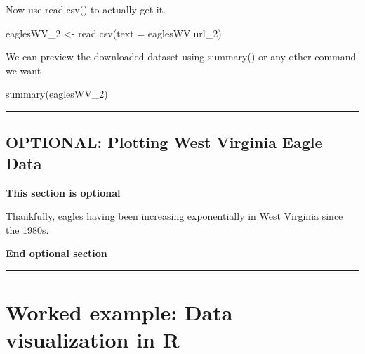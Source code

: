 \documentclass[
]{book}
\newenvironment{Shaded}{\begin{snugshade}}{\end{snugshade}}
\newcommand{\AttributeTok}[1]{\textcolor[rgb]{0.77,0.63,0.00}{#1}}
\newcommand{\FunctionTok}[1]{\textcolor[rgb]{0.00,0.00,0.00}{#1}}
\newcommand{\NormalTok}[1]{#1}
\newcommand{\OtherTok}[1]{\textcolor[rgb]{0.56,0.35,0.01}{#1}}
\newcommand{\SpecialCharTok}[1]{\textcolor[rgb]{0.00,0.00,0.00}{#1}}
\begin{document}
Now use read.csv() to actually get it.

\begin{Shaded}
\begin{Highlighting}[]
\NormalTok{eaglesWV\_2 }\OtherTok{\textless{}{-}} \FunctionTok{read.csv}\NormalTok{(}\AttributeTok{text =}\NormalTok{ eaglesWV.url\_2)}
\end{Highlighting}
\end{Shaded}

We can preview the downloaded dataset using summary() or any other command we want

\begin{Shaded}
\begin{Highlighting}[]
\FunctionTok{summary}\NormalTok{(eaglesWV\_2)}
\end{Highlighting}
\end{Shaded}

\begin{center}\rule{0.5\linewidth}{0.5pt}\end{center}

\hypertarget{optional-plotting-west-virginia-eagle-data}{%
\section{OPTIONAL: Plotting West Virginia Eagle Data}\label{optional-plotting-west-virginia-eagle-data}}

\textbf{This section is optional}

Thankfully, eagles having been increasing exponentially in West Virginia since the 1980s.

\begin{Shaded}
\end{Shaded}

\textbf{End optional section}

\begin{center}\rule{0.5\linewidth}{0.5pt}\end{center}

\hypertarget{worked-example-data-visualization-in-r}{%
\chapter{Worked example: Data visualization in R}\label{worked-example-data-visualization-in-r}}
\end{document}
